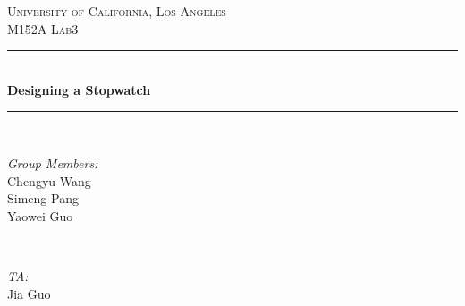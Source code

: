 \documentclass[12pt]{article}
\begin{document}
\begin{titlepage}

\newcommand{\HRule}{\rule{\linewidth}{0.5mm}} %

\center %
 

\textsc{\LARGE University of California, Los Angeles}\\[1.5cm] %
\textsc{\Large M152A Lab3}\\[0.5cm] %
 


\HRule \\[0.4cm]
{ \huge \bfseries Designing a Stopwatch}\\[0.4cm] %
\HRule \\[1.5cm]
 

\begin{minipage}{0.4\textwidth}
\begin{flushleft} \large
\emph{Group Members:}\\
Chengyu Wang\\
Simeng Pang\\
Yaowei Guo%
\end{flushleft}
\end{minipage}
~
\begin{minipage}{0.4\textwidth}
\begin{flushright} \large
\emph{TA:} \\
Jia Guo %
\end{flushright}
\end{minipage}\\[4cm]



\end{titlepage}
\end{document}
